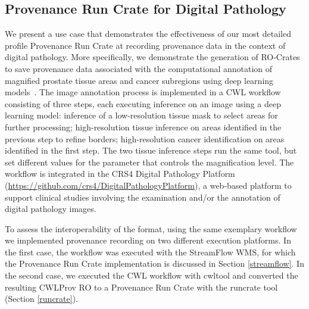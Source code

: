 \documentclass[10pt,letterpaper]{article}
\begin{document}
\subsection{Provenance Run Crate for Digital Pathology}\label{provenance-run-crate-for-digital-pathology}

We present a use case that demonstrates the effectiveness of our most detailed profile Provenance Run Crate at recording provenance data in the context of digital pathology.
More specifically, we demonstrate the generation of RO-Crates to save provenance data associated with the computational annotation of magnified prostate tissue areas and cancer subregions using deep learning models~\cite{Del Rio 2022}.
The image annotation process is implemented in a CWL workflow consisting of three steps, each executing inference on an image using a deep learning model: inference of a low-resolution tissue mask to select areas for further processing;
high-resolution tissue inference on areas identified in the previous step to refine borders; high-resolution cancer identification on areas identified in the first step.
The two tissue inference steps run the same tool, but set different values for the parameter that controls the magnification level.
The workflow is integrated in the CRS4 Digital Pathology Platform (\url{https://github.com/crs4/DigitalPathologyPlatform}), a web-based platform to support clinical studies involving the examination and/or the annotation of digital pathology images.

To assess the interoperability of the format, using the same exemplary workflow we implemented provenance recording on two different execution platforms.
In the first case, the workflow was executed with the StreamFlow WMS, for which the Provenance Run Crate implementation is discussed in Section \ref{streamflow}.
In the second case, we executed the CWL workflow with cwltool and converted the resulting CWLProv RO to a Provenance Run Crate with the runcrate tool (Section \ref{runcrate}).
\end{document}
